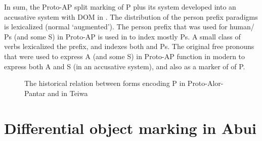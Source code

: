 \documentclass[output=paper]{LSP/langsci}
\begin{document}
In sum, the Proto-AP split marking of P plus its  system developed into an accusative system with DOM in . The distribution of the person prefix paradigms is lexicalized (normal \vs ‘augmented’). The person prefix that was used for human/ Ps (and some S) in Proto-AP is used in  to index mostly  Ps. A small class of verbs lexicalized the prefix, and indexes both  and  Ps. The original free pronouns that were used to express A (and some S) in Proto-AP function in modern  to express both A and S (in an accusative system), and also as a marker of  of P.

\begin{figure}
	\caption{The historical relation between forms encoding P in Proto-Alor-Pantar and in Teiwa}\label{03-kl-fig:6}
\end{figure}
 
 \largerpage 
\section{Differential object marking in Abui} 
\label{03-kl-sec:5}
\end{document}
